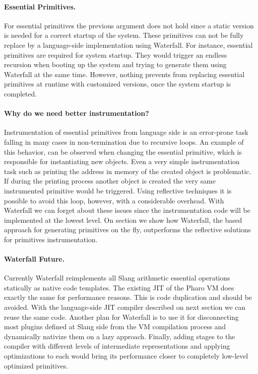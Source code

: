 \paragraph{Essential Primitives.}
For essential primitives the previous argument does not hold since a static version is needed for a correct startup of the system.
These primitives can not be fully replace by a language-side implementation using Waterfall.
For instance, essential primitives are required for system startup.
They would trigger an endless recursion when booting up the system and trying to generate them using Waterfall at the same time.
However, nothing prevents from replacing essential primitives at runtime with customized versions, once the system startup is completed. 

\paragraph{Why do we need better instrumentation?}
Instrumentation of essential primitives from language side is an error-prone task falling in many cases in non-termination due to recursive loops. 
An example of this behavior, can be observed when changing the essential  primitive, which is responsible for instantiating new objects.
Even a very simple instrumentation task such as printing the address in memory of the created object is problematic.
If during the printing process another object is created the very same instrumented  primitive would be triggered.
Using reflective techniques it is possible to avoid this loop, however, with a considerable overhead.
With Waterfall we can forget about these issues since the instrumentation code will be implemented at the lowest level.
On section  we show how Waterfall, the \B based approach for generating primitives on the fly, outperforms the reflective solutions for primitives instrumentation. 


\paragraph{Waterfall Future.}
Currently Waterfall reimplements all Slang arithmetic essential operations statically as native code templates.
The existing JIT of the Pharo VM does exactly the same for performance reasons.
This is code duplication and should be avoided.
With the language-side JIT compiler described on next section we can reuse the same code. Another plan for Waterfall is to use it for disconnecting most plugins defined at Slang side from the VM compilation process and dynamically nativize them on a lazy approach.
Finally, adding stages to the compiler with different levels of intermediate representations and applying optimizations to each would bring its performance closer to completely low-level optimized primitives.


